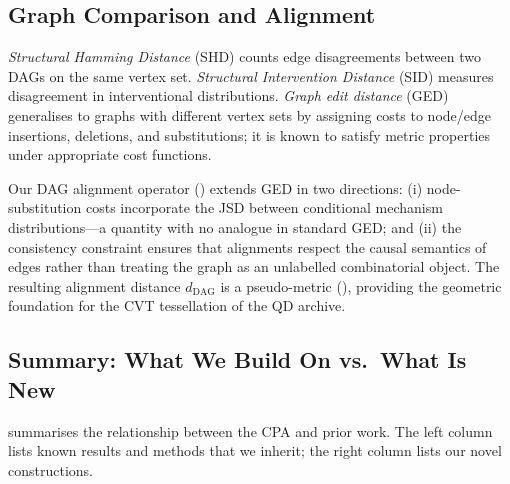 \documentclass[11pt,a4paper]{article}
\theoremstyle{definition}
\newcommand{\dDAG}{d_{\mathrm{DAG}}}          %
\begin{document}
\subsection{Graph Comparison and Alignment}

\emph{Structural Hamming Distance} (SHD) counts edge disagreements between
two DAGs on the same vertex set.  \emph{Structural Intervention Distance}
(SID) \citep{peters2015structural} measures disagreement in
interventional distributions.  \emph{Graph edit distance} (GED)
\citep{gao2010survey,bougleux2017graph} generalises to graphs with
different vertex sets by assigning costs to node/edge insertions,
deletions, and substitutions; it is known to satisfy metric properties
under appropriate cost functions.

Our DAG alignment operator () extends GED in two
directions: (i) node-substitution costs incorporate the JSD between
conditional mechanism distributions---a quantity with no analogue in
standard GED; and (ii) the consistency constraint ensures that alignments
respect the causal semantics of edges rather than treating the graph as an
unlabelled combinatorial object.  The resulting alignment distance $\dDAG$
is a pseudo-metric (), providing the geometric
foundation for the CVT tessellation of the QD archive.

\subsection{Summary: What We Build On vs.\ What Is New}

 summarises the relationship between the CPA and prior
work.  The left column lists known results and methods that we inherit; the
right column lists our novel constructions.
\end{document}
